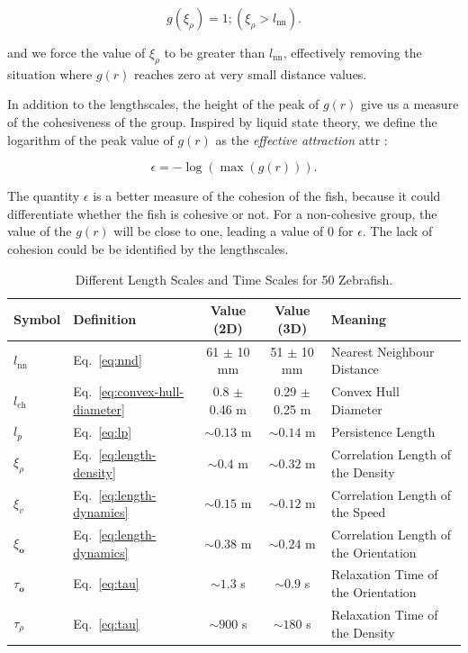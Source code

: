 \documentclass[11pt,twoside]{report}
\begin{document}
\begin{equation}
	g(\xi_\rho) = 1; (\xi_\rho > l_\mathrm{nn}).
\label{eq:length-density}
\end{equation}

\noindent and we force the value of $\xi_\rho$ to be greater than $l_\mathrm{nn}$, effectively removing the situation where $g(r)$ reaches zero at very small distance values.

In addition to the lengthscales, the height of the peak of $g(r)$ give us a measure of the cohesiveness of the group. Inspired by liquid state theory, we define the logarithm of the peak value of $g(r)$ as the \emph{effective attraction} \gls{attr} \cite{hansen2013}:

\begin{equation}
\epsilon = -\log\left(
	\max(g(r))
\right).
\label{eq:effective-attraction}
\end{equation}

\noindent The quantity $\epsilon$ is a better measure of the cohesion of the fish, because it could differentiate whether the fish is cohesive or not. For a non-cohesive group, the value of the $g(r)$ will be close to one, leading a value of 0 for $\epsilon$. The lack of cohesion could be be identified by the lengthscales.


\begin{table}
\begin{adjustwidth*}{0in}{-1.5in}
	\centering
	\begin{tabular}{ l l c c l }
		\toprule
		Symbol & Definition & Value (2D) & Value (3D) & Meaning\\
		\midrule
		$l_\mathrm{nn}$ &
		Eq.~\ref{eq:nnd} &
		61 $\pm$ 10 mm &
		51 $\pm$ 10 mm &
		Nearest Neighbour Distance
		\\
		$l_\mathrm{ch}$ &
		Eq.~\ref{eq:convex-hull-diameter} &
		0.8 $\pm$ 0.46 m &
		0.29 $\pm$ 0.25 m &
		Convex Hull Diameter\\
		$l_p$ &
		Eq.~\ref{eq:lp} &
		$\sim 0.13$ m &
		$\sim 0.14$ m &
		Persistence Length\\
		$\xi_\rho$ &
		Eq.~\ref{eq:length-density} &
		$\sim 0.4$ m &
		$\sim 0.32$ m &
		Correlation Length of the Density\\
		$\xi_v$ &
		Eq.~\ref{eq:length-dynamics} &
		$\sim 0.15$ m &
		$\sim 0.12$ m &
		Correlation Length of the Speed\\
		$\xi_\mathbf{o}$ &
		Eq.~\ref{eq:length-dynamics} &
		$\sim 0.38$ m &
		$\sim 0.24$ m &
		Correlation Length of the Orientation\\
		$\tau_\mathbf{o}$ &
		Eq.~\ref{eq:tau} &
		$\sim 1.3$ s &
		$\sim 0.9$ s &
		Relaxation Time of the Orientation\\
		$\tau_\rho$ &
		Eq.~\ref{eq:tau} &
		$\sim 900$ s &
		$\sim 180$ s &
		Relaxation Time of the Density\\
	\bottomrule
	\end{tabular}
\caption{
Different Length Scales and Time Scales for 50 Zebrafish.}
\label{table:behaviour}
\end{adjustwidth*}
\end{table}
\end{document}

